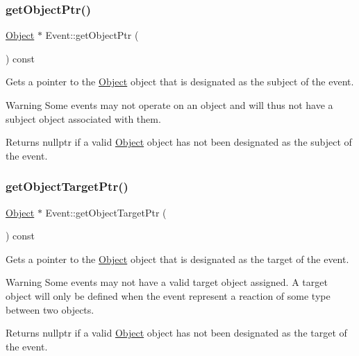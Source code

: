 \mbox{\label{class_event_a5317d42bb07d0e75bec0c13bd9bf6de8}} 
\subsubsection{\texorpdfstring{get\+Object\+Ptr()}{getObjectPtr()}}
{\footnotesize\ttfamily \hyperlink{class_object}{Object} $\ast$ Event\+::get\+Object\+Ptr (\begin{DoxyParamCaption}{ }\end{DoxyParamCaption}) const}



Gets a pointer to the \hyperlink{class_object}{Object} object that is designated as the subject of the event. 

\begin{DoxyWarning}{Warning}
Some events may not operate on an object and will thus not have a subject object associated with them. 
\end{DoxyWarning}
\begin{DoxyReturn}{Returns}
nullptr if a valid \hyperlink{class_object}{Object} object has not been designated as the subject of the event. 
\end{DoxyReturn}
\mbox{\label{class_event_ab86f724c3c894faa1d6ccca78c357d24}} 
\subsubsection{\texorpdfstring{get\+Object\+Target\+Ptr()}{getObjectTargetPtr()}}
{\footnotesize\ttfamily \hyperlink{class_object}{Object} $\ast$ Event\+::get\+Object\+Target\+Ptr (\begin{DoxyParamCaption}{ }\end{DoxyParamCaption}) const}



Gets a pointer to the \hyperlink{class_object}{Object} object that is designated as the target of the event. 

\begin{DoxyWarning}{Warning}
Some events may not have a valid target object assigned. A target object will only be defined when the event represent a reaction of some type between two objects. 
\end{DoxyWarning}
\begin{DoxyReturn}{Returns}
nullptr if a valid \hyperlink{class_object}{Object} object has not been designated as the target of the event. 
\end{DoxyReturn}
\mbox{\label{class_event_a166ae40f2bf26c1e08097697ca76c884}} 
